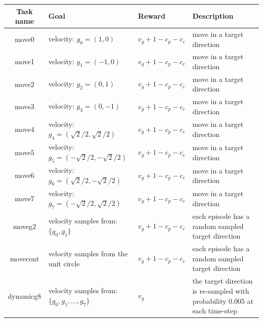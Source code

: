 \begin{table}[!htbp]

\begin{center}
\begin{tabular}{|c|p{3cm}|p{4cm}|p{4cm}|}
\hline
Task name & Goal & Reward  &  Description \\
\hline\hline
move0 & velocity: $g_0=(1,0)$ &$ v_g+1-c_p-c_c$  & move in a target direction \\
\hline
move1 & velocity: $g_1=(-1,0)$ &$ v_g+1-c_p-c_c$  & move in a target direction\\
\hline
move2 & velocity: $g_2=(0,1)$ &$ v_g+1-c_p-c_c$  & move in a target direction \\
\hline
move3 & velocity: $g_3=(0,-1)$ &$ v_g+1-c_p-c_c$  & move in a target direction \\ 
\hline 
move4 & velocity: $g_4=(\sqrt{2}/2,\sqrt{2}/2)$ &$ v_g+1-c_p-c_c$  & move in a target direction \\ 
\hline 
move5 & velocity: $g_5=(-\sqrt{2}/2,-\sqrt{2}/2)$ &$ v_g+1-c_p-c_c$  & move in a target direction \\ 
\hline 
move6 & velocity: $g_6=(\sqrt{2}/2,-\sqrt{2}/2)$ &$ v_g+1-c_p-c_c$  & move in a target direction \\ 
\hline 
move7 & velocity: $g_7=(-\sqrt{2}/2,\sqrt{2}/2)$ &$ v_g+1-c_p-c_c$  & move in a target direction \\ 
\hline 
moveg2 & velocity samples from: $\{g_0,g_1\}$ &$ v_g+1-c_p-c_c$  & each episode has a random sampled target direction \\ \hline
movecont & velocity samples from the unit circle&$ v_g+1-c_p-c_c$  & each episode has a random sampled target direction \\ \hline
dynamicg8 &  velocity samples from: $\{g_0,g_1, \dots,g_7\}$ &$ v_g$  & the target direction is re-sampled with probability 0.005 at each time-step  \\ \hline

\end{tabular}
\end{center}
\end{table}
